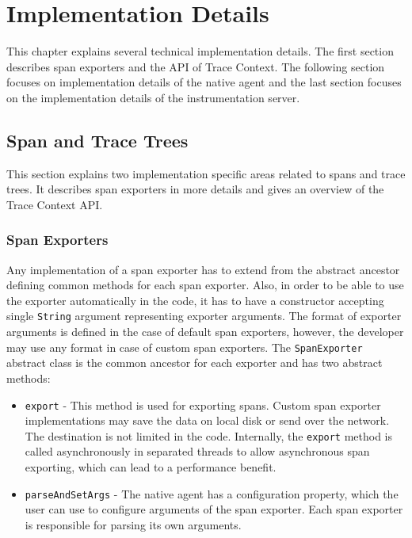 \chapter{Implementation Details}
\label{chap:implementation}
This chapter explains several technical implementation details. The first section describes span exporters and the API of Trace Context. The following section focuses on implementation details of the native agent and the last section focuses on the implementation details of the instrumentation server.

\section{Span and Trace Trees}
This section explains two implementation specific areas related to spans and trace trees. It describes span exporters in more details and gives an overview of the Trace Context API. 
\subsection{Span Exporters}
\label{imp:exporter}
Any implementation of a span exporter has to extend from the abstract ancestor defining common methods for each span exporter. Also, in order to be able to use the exporter automatically in the code, it has to have a constructor accepting single \texttt{String} argument representing exporter arguments. The format of exporter arguments is defined in the case of default span exporters, however, the developer may use any format in case of custom span exporters. The \texttt{SpanExporter} abstract class is the common ancestor for each exporter and has two abstract methods:
\begin{itemize}
	\item \texttt{export} - This method is used for exporting spans. Custom span exporter implementations may save the data on local disk or send over the network. The destination is not limited in the code. Internally, the \texttt{export} method is called asynchronously in separated threads to allow asynchronous span exporting, which can lead to a performance benefit.
	\item \texttt{parseAndSetArgs} - The native agent has a configuration property, which the user can use to configure arguments of the span exporter. Each span exporter is responsible for parsing its own arguments.
\end{itemize}

